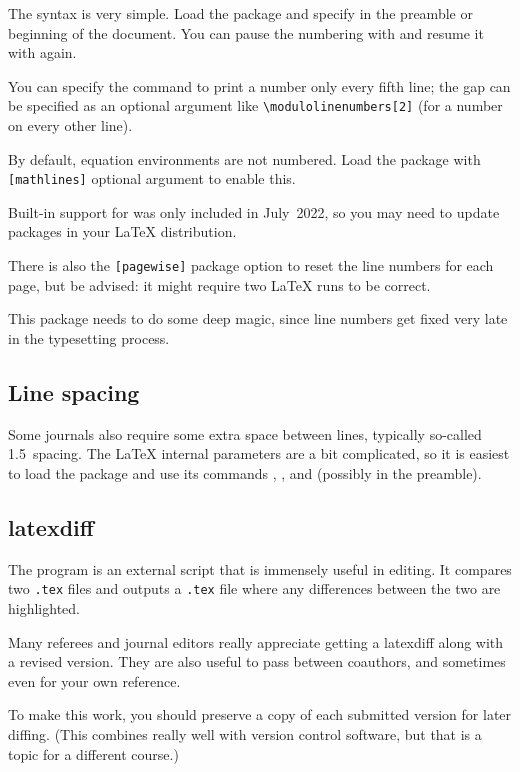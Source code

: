 The syntax is very simple.
Load the package and specify  in the preamble or beginning of the document.
You can pause the numbering with  and resume it with  again.

You can specify the  command to print a number only every fifth line;
the gap can be specified as an optional argument like \verb|\modulolinenumbers[2]|
(for a number on every other line).

By default, equation environments are not numbered.
Load the package with \verb|[mathlines]| optional argument to enable this.

\begin{gotcha}
Built-in support for 
was only included in July~2022,
so you may need to update packages in your \LaTeX{} distribution.
\end{gotcha}

There is also the \verb|[pagewise]| package option
to reset the line numbers for each page, but be advised:
it might require two \LaTeX{} runs to be correct.

\begin{technote}
This package needs to do some deep magic,
since line numbers get fixed very late in the typesetting process.
\end{technote}


%
\subsection{Line spacing}

Some journals also require some extra space between lines,
typically so-called 1.5~spacing.
The \LaTeX{} internal parameters are a bit complicated, so it is easiest to load the
 package and use its commands
, , and  (possibly in the preamble).


%
\subsection{latexdiff}

The  program is an external script that is immensely useful in editing.
It compares two \verb|.tex| files and outputs a \verb|.tex| file
where any differences between the two are highlighted.

\begin{practices}
Many referees and journal editors really appreciate getting a latexdiff along with a revised version.
They are also useful to pass between coauthors,
and sometimes even for your own reference.

To make this work, you should preserve a copy of each submitted version for later diffing.
(This combines really well with version control software,
but that is a topic for a different course.)
\end{practices}

